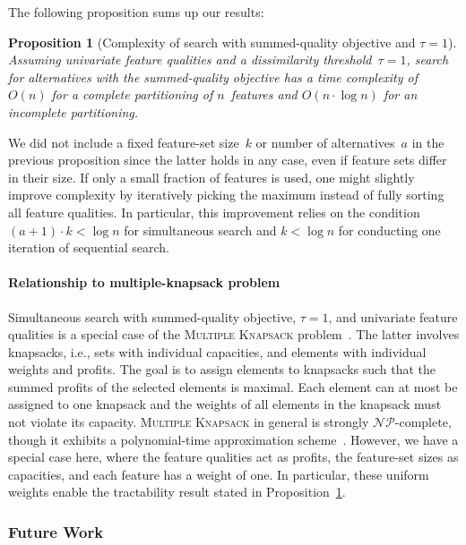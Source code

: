 \documentclass{article}
\newtheorem{proposition}[corollary]{Proposition} %
\theoremstyle{definition}
\begin{document}
The following proposition sums up our results:
%
\begin{proposition}[Complexity of search with summed-quality objective and $\tau=1$]
	Assuming univariate feature qualities and a dissimilarity threshold~$\tau = 1$, search for alternatives with the summed-quality objective has a time complexity of $O(n)$ for a complete partitioning of $n$~features and $O(n \cdot \log n)$ for an incomplete partitioning.
	\label{prop:afs:complexity-partitioning-sum}
\end{proposition}
%
We did not include a fixed feature-set size~$k$ or number of alternatives~$a$ in the previous proposition since the latter holds in any case, even if feature sets differ in their size.
If only a small fraction of features is used, one might slightly improve complexity by iteratively picking the maximum instead of fully sorting all feature qualities.
In particular, this improvement relies on the condition $(a + 1) \cdot k < \log n$ for simultaneous search and $k < \log n$ for conducting one iteration of sequential search.

\paragraph{Relationship to multiple-knapsack problem}

Simultaneous search with summed-quality objective, $\tau=1$, and univariate feature qualities is a special case of the \textsc{Multiple Knapsack} problem~\cite{chekuri2005polynomial}.
The latter involves knapsacks, i.e., sets with individual capacities, and elements with individual weights and profits.
The goal is to assign elements to knapsacks such that the summed profits of the selected elements is maximal.
Each element can at most be assigned to one knapsack and the weights of all elements in the knapsack must not violate its capacity.
\textsc{Multiple Knapsack} in general is strongly $\mathcal{NP}$-complete, though it exhibits a polynomial-time approximation scheme~\cite{chekuri2005polynomial}.
However, we have a special case here, where the feature qualities act as profits, the feature-set sizes as capacities, and each feature has a weight of one.
In particular, these uniform weights enable the tractability result stated in Proposition~\ref{prop:afs:complexity-partitioning-sum}.

\subsubsection{Future Work}
\label{sec:afs:appendix:complexity:future}
\end{document}

